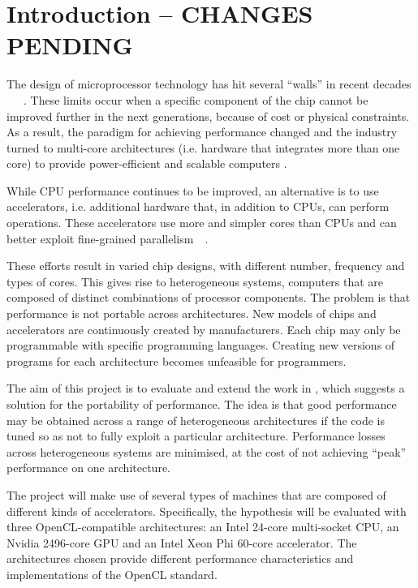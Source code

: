 \chapter{Introduction -- CHANGES PENDING}
\label{cha:intro}


The design of microprocessor technology has hit several ``walls'' in recent decades ~\cite{Collange2013}~\cite{borkar1999design}~\cite{2_sutter_2015}. These limits occur when a specific component of the chip cannot be improved further in the next generations, because of cost or physical constraints. As a result, the paradigm for achieving performance changed and the industry turned to \gls{multi-core} architectures (i.e. hardware that integrates more than one \gls{core}) to provide power-efficient and scalable computers \cite{flynn2005microprocessor}.

While CPU performance continues to be improved, an alternative is to use \glspl{accelerator}, i.e. additional hardware that, in addition to CPUs, can perform operations. These accelerators use more and simpler cores than CPUs and can better exploit fine-grained parallelism~\cite{borkar2007thousand}~\cite{Collange2013}.

These efforts result in varied chip designs, with different number, frequency and types of cores. This gives rise to \gls{heterogeneous} systems, computers that are composed of distinct combinations of processor components. The problem is that performance is not portable across architectures. New models of chips and accelerators are continuously created by manufacturers. Each chip may only be programmable with specific programming languages. Creating new versions of programs for each architecture becomes unfeasible for programmers.

The aim of this project is to evaluate and extend the work in \cite{dolbeau2013one}, which suggests a solution for the portability of performance. The idea is that good performance may be obtained across a range of heterogeneous architectures if the code is tuned so as not to fully exploit a particular architecture. Performance losses across heterogeneous systems are minimised, at the cost of not achieving ``peak'' performance on one architecture.

The project will make use of several types of machines that are composed of different kinds of accelerators. Specifically, the hypothesis will be evaluated with three OpenCL-compatible architectures: an Intel 24-core multi-socket CPU, an Nvidia 2496-core GPU and an Intel Xeon Phi 60-core accelerator. The architectures chosen provide different performance characteristics and implementations of the OpenCL standard.

